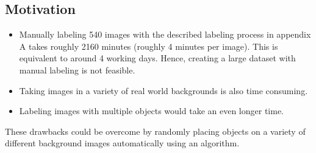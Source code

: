 \subsection{Motivation}
	\begin{itemize}
		\item Manually labeling 540 images with the described labeling process in appendix A takes roughly 2160 minutes (roughly 4 minutes per image). This is equivalent to around 4 working days. Hence, creating a large dataset with manual labeling is not feasible.
		\item Taking images in a variety of real world backgrounds is also time consuming.
		\item Labeling images with multiple objects would take an even longer time.
	\end{itemize}
	
These drawbacks could be overcome by randomly placing objects on a variety of different background images automatically using an algorithm.

